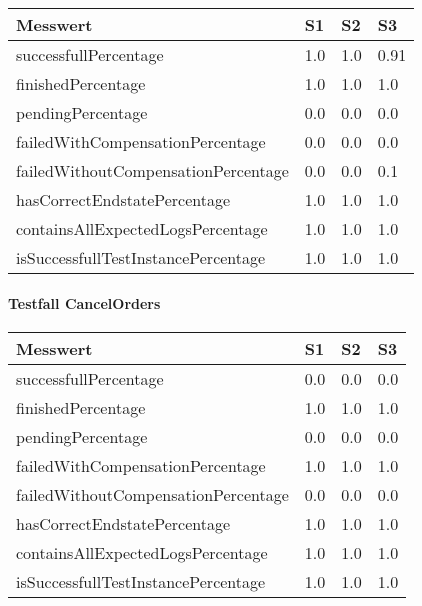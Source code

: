 \begin{center}
	\fontsize{9}{12}\selectfont
	\begin{longtable}[h]{|p{5cm}|p{1cm}|p{1cm}|p{1cm}|}
		\hline
		Messwert & S1 & S2 & S3 \\ \hline
		\endhead
		\endfoot
		successfull\-Percentage & 1.0 & 1.0 & 0.91 \\ \hline
		finished\-Percentage & 1.0 & 1.0 & 1.0 \\ \hline
		pending\-Percentage & 0.0 & 0.0 & 0.0 \\ \hline
		failedWithCompensation\-Percentage & 0.0 & 0.0 & 0.0 \\ \hline
		failedWithoutCompensation\-Percentage & 0.0 & 0.0 & 0.1 \\ \hline
		hasCorrectEndstate\-Percentage & 1.0 & 1.0 & 1.0 \\ \hline
		containsAllExpectedLogs\-Percentage & 1.0 & 1.0 & 1.0 \\ \hline
		isSuccessfullTestInstance\-Percentage & 1.0 & 1.0 & 1.0 \\ \hline
	\end{longtable}
\end{center}
\FloatBarrier

\paragraph*{Testfall CancelOrders}

\begin{center}
	\fontsize{9}{12}\selectfont
	\begin{longtable}[h]{|p{5cm}|p{1cm}|p{1cm}|p{1cm}|}
		\hline
		Messwert & S1 & S2 & S3 \\ \hline
		\endhead
		\endfoot
		successfull\-Percentage & 0.0 & 0.0 & 0.0 \\ \hline
		finished\-Percentage & 1.0 & 1.0 & 1.0 \\ \hline
		pending\-Percentage & 0.0 & 0.0 & 0.0 \\ \hline
		failedWithCompensation\-Percentage & 1.0 & 1.0 & 1.0 \\ \hline
		failedWithoutCompensation\-Percentage & 0.0 & 0.0 & 0.0 \\ \hline
		hasCorrectEndstate\-Percentage & 1.0 & 1.0 & 1.0 \\ \hline
		containsAllExpectedLogs\-Percentage & 1.0 & 1.0 & 1.0 \\ \hline
		isSuccessfullTestInstance\-Percentage & 1.0 & 1.0 & 1.0 \\ \hline
	\end{longtable}
\end{center}
\FloatBarrier

